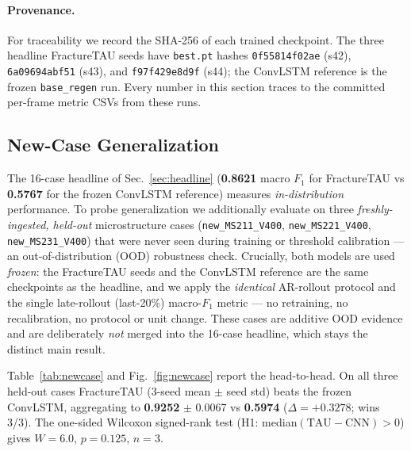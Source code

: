 \documentclass[11pt]{article}
\begin{document}
\paragraph{Provenance.}
For traceability we record the SHA-256 of each trained checkpoint. The three
headline FractureTAU seeds have \texttt{best.pt} hashes \texttt{0f55814f02ae}
(s42), \texttt{6a09694abf51} (s43), and \texttt{f97f429e8d9f} (s44); the ConvLSTM
reference is the frozen \texttt{base\_regen} run. Every number in this section
traces to the committed per-frame metric CSVs from these runs.

\subsection{New-Case Generalization}
\label{sec:newcase}

The 16-case headline of Sec.~\ref{sec:headline} (\textbf{0.8621} macro $F_1$ for
FractureTAU vs \textbf{0.5767} for the frozen ConvLSTM reference) measures
\emph{in-distribution} performance. To probe generalization we additionally evaluate
on three \emph{freshly-ingested, held-out} microstructure cases
(\texttt{new\_MS211\_V400}, \texttt{new\_MS221\_V400}, \texttt{new\_MS231\_V400})
that were never seen during training or threshold calibration --- an
out-of-distribution (OOD) robustness check. Crucially, both models are used
\emph{frozen}: the FractureTAU seeds and the ConvLSTM reference are the same
checkpoints as the headline, and we apply the \emph{identical} AR-rollout protocol
and the single late-rollout (last-20\%) macro-$F_1$ metric --- no retraining, no
recalibration, no protocol or unit change. These cases are additive OOD evidence
and are deliberately \emph{not} merged into the 16-case headline, which stays the
distinct main result.

Table~\ref{tab:newcase} and Fig.~\ref{fig:newcase} report the head-to-head. On all
three held-out cases FractureTAU (3-seed mean $\pm$ seed std) beats the frozen
ConvLSTM, aggregating to \textbf{0.9252} $\pm$ 0.0067 vs \textbf{0.5974}
($\Delta = +0.3278$; wins 3/3). The one-sided Wilcoxon signed-rank test
(H1: median$(\mathrm{TAU}-\mathrm{CNN}) > 0$) gives $W = 6.0$, $p = 0.125$,
$n = 3$.
\end{document}
